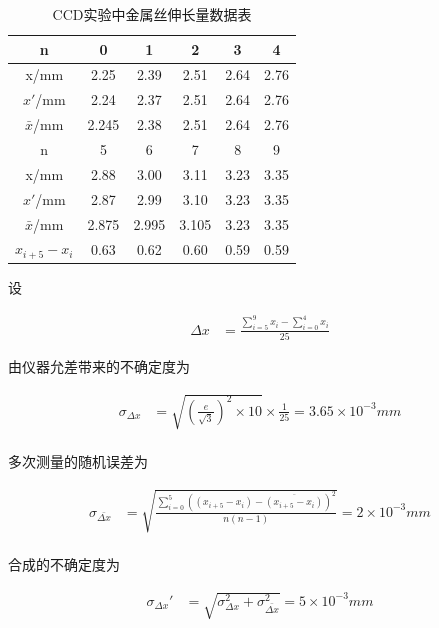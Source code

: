\documentclass[a4paper,10pt,notitlepage]{article}
\begin{document}
\begin{center}

	\begin{longtable}{|c|c|c|c|c|c|}
	\caption{CCD实验中金属丝伸长量数据表} \\
	\hline
	n & 0 & 1 & 2 & 3 & 4 \\
	\hline
	x/mm & 2.25 & 2.39 & 2.51 & 2.64 & 2.76 \\
	\hline
	$x'$/mm & 2.24 & 2.37 & 2.51 & 2.64 & 2.76 \\
	\hline
	$\bar{x}$/mm & 2.245 & 2.38 & 2.51 & 2.64 & 2.76 \\
	\hline
	n & 5 & 6 & 7 & 8 & 9 \\
	\hline
	x/mm & 2.88 & 3.00 & 3.11 & 3.23 & 3.35 \\
	\hline
	$x'$/mm & 2.87 & 2.99 & 3.10 & 3.23 & 3.35 \\
	\hline
	$\bar{x}$/mm & 2.875 & 2.995 & 3.105 & 3.23 & 3.35 \\
	\hline
	$x_{i+5} - x_i$ & 0.63 & 0.62 & 0.60 & 0.59 & 0.59 \\
	\hline
	\end{longtable}
	
\end{center}
	
	设
	
\begin{align*}
	\Delta x &= \frac{\sum_{i = 5}^9x_i - \sum_{i = 0}^4x_i}{25} 
\end{align*}

	由仪器允差带来的不确定度为
	
\begin{align*}
	\sigma_{\Delta x} &= \sqrt{(\frac{e}{\sqrt{3}})^2 \times 10} \times \frac{1}{25} = 3.65 \times 10^{-3} mm \\
\end{align*}

	多次测量的随机误差为
	
\begin{align*}
	\sigma_{\bar{\Delta x}} &= \sqrt{\frac{\sum_{i = 0}^5 ((x_{i+5} - x_i) - \overline{(x_{i+5} - x_i)}) ^ 2}{n ( n - 1)}} = 2 \times 10^{-3} mm\\
\end{align*}

	合成的不确定度为
	
\begin{align*}
	\sigma_{\Delta x}' &= \sqrt{\sigma_{\Delta x}^2 + \sigma_{\bar{\Delta x}}^2} = 5 \times 10^{-3} mm \\
\end{align*}
\end{document}
